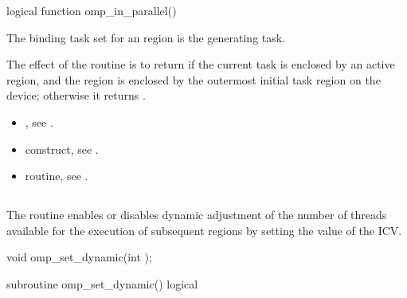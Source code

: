 \begin{fortranspecific}
\begin{boxedcode}
logical function omp\_in\_parallel()
\end{boxedcode}
\end{fortranspecific}

\binding
The binding task set for an  region is the generating task.

\effect
The effect of the  routine is to return  if the current task is 
enclosed by an active  region, and the  region is enclosed by the 
outermost initial task region on the device; otherwise it returns .

\crossreferences
\begin{itemize}
\item {}, see 
.

\item {} construct, see 
.

\item {} routine, see 
.
\end{itemize}








\bigskip
\subsection{}
\label{subsec:omp_set_dynamic}
\summary
The  routine enables or disables dynamic adjustment of the 
number of threads available for the execution of subsequent  regions by 
setting the value of the  ICV.


\pagebreak
\format
\begin{ccppspecific}
\begin{boxedcode}
void omp\_set\_dynamic(int );
\end{boxedcode}
\end{ccppspecific}
\bigskip

\begin{samepage}
\begin{fortranspecific}
\begin{boxedcode}
subroutine omp\_set\_dynamic()
logical 
\end{boxedcode}
\end{fortranspecific}
\end{samepage}

